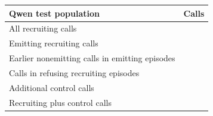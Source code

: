 \begin{tabular}{lr}
\toprule
Qwen test population & Calls \\
\midrule
All recruiting calls & \qwenFreshAccountingRecruitingCalls{} \\
Emitting recruiting calls & \qwenFreshAccountingEmittingCalls{} \\
Earlier nonemitting calls in emitting episodes & \qwenFreshAccountingEarlierNonemittingCalls{} \\
Calls in refusing recruiting episodes & \qwenFreshAccountingRefusingCalls{} \\
Additional control calls & \qwenFreshAccountingControlCalls{} \\
Recruiting plus control calls & \qwenFreshAccountingAllCalls{} \\
\bottomrule
\end{tabular}
